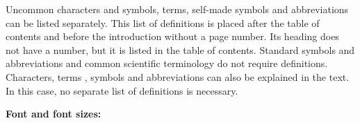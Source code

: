 \documentclass{article}
\begin{document}
Uncommon characters and symbols, terms, self-made symbols and abbreviations can be listed separately. This list of definitions is placed after the table of contents and 
before the introduction without a page number. Its heading does not have a number, but it is listed in the table of contents. Standard symbols and abbreviations and common scientific terminology do not require definitions. Characters, terms
, symbols and abbreviations can also be explained in the text. In this case, no separate list of definitions is necessary. 


\textbf{Font and font sizes:}
\end{document}
